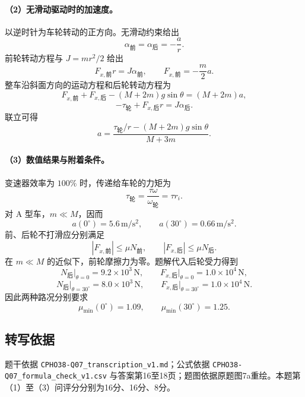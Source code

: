 \paragraph{（2）无滑动驱动时的加速度。}
以逆时针为车轮转动的正方向。无滑动约束给出
\[
\alpha_{\text{前}}=\alpha_{\text{后}}=-\frac ar.
\]
前轮转动方程与 $J=mr^2/2$ 给出
\[
F_{x,\text{前}}r=J\alpha_{\text{前}},
\qquad F_{x,\text{前}}=-\frac m2a.
\]
整车沿斜面方向的运动方程和后轮转动方程为
\[
F_{x,\text{前}}+F_{x,\text{后}}-(M+2m)g\sin\theta=(M+2m)a,
\]
\[
-\tau_{\text{轮}}+F_{x,\text{后}}r=J\alpha_{\text{后}}.
\]
联立可得
\[
\boxed{a=\frac{\tau_{\text{轮}}/r-(M+2m)g\sin\theta}{M+3m}.}
\]

\paragraph{（3）数值结果与附着条件。}
变速器效率为 $100\%$ 时，传递给车轮的力矩为
\[
\tau_{\text{轮}}=\frac{\tau\omega}{\omega_{\text{轮}}}=\tau r_i.
\]
对 A 型车，$m\ll M$，因而
\[
\boxed{a(0^\circ)=5.6\,\mathrm{m/s^2},\qquad
a(30^\circ)=0.66\,\mathrm{m/s^2}.}
\]
前、后轮不打滑应分别满足
\[
|F_{x,\text{前}}|\le\mu N_{\text{前}},\qquad
|F_{x,\text{后}}|\le\mu N_{\text{后}}.
\]
在 $m\ll M$ 的近似下，前轮摩擦力为零。题解代入后轮受力得到
\[
N_{\text{后}}\big|_{\theta=0}=9.2\times10^3\,\mathrm N,
\qquad F_{x,\text{后}}\big|_{\theta=0}=1.0\times10^4\,\mathrm N,
\]
\[
N_{\text{后}}\big|_{\theta=30^\circ}=8.0\times10^3\,\mathrm N,
\qquad F_{x,\text{后}}\big|_{\theta=30^\circ}=1.0\times10^4\,\mathrm N.
\]
因此两种路况分别要求
\[
\boxed{\mu_{\min}(0^\circ)=1.09,\qquad
\mu_{\min}(30^\circ)=1.25.}
\]

\subsection{转写依据}
题干依据 \texttt{CPHO38-Q07\_transcription\_v1.md}；公式依据 \texttt{CPHO38-Q07\_formula\_check\_v1.csv} 与答案第16至18页；题图依据原题图7a重绘。本题第（1）至（3）问评分分别为16分、16分、8分。
